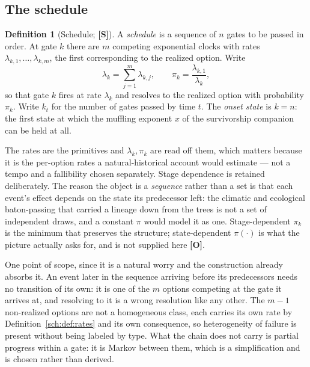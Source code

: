 \documentclass[11pt]{article}
\theoremstyle{plain}
\theoremstyle{definition}
\newtheorem{definition}[theorem]{Definition}
\theoremstyle{remark}
\begin{document}
\subsection{The schedule}\label{sch:subsub:model}

\begin{definition}[Schedule; \textbf{[S]}]\label{sch:def:schedule}
A \emph{schedule} is a sequence of $n$ gates to be passed in order. At
gate $k$ there are $m$ competing exponential clocks with rates
$\lambda_{k,1},\dots,\lambda_{k,m}$, the first corresponding to the
realized option. Write
\begin{equation}\label{sch:eq:clocks}
\lambda_k=\sum_{j=1}^{m}\lambda_{k,j},
\qquad
\pi_k=\frac{\lambda_{k,1}}{\lambda_k},
\end{equation}
so that gate $k$ fires at rate $\lambda_k$ and resolves to the realized
option with probability $\pi_k$. Write $k_t$ for the number of gates
passed by time $t$. The \emph{onset state} is $k=n$: the first state at
which the muffling exponent $x$ of the survivorship companion \cite{SurvA} can be held at all.
\end{definition}

The rates are the primitives and $\lambda_k,\pi_k$ are read off them,
which matters because it is the per-option rates a natural-historical
account would estimate --- not a tempo and a fallibility chosen
separately. Stage dependence is retained deliberately. The reason the object is a
\emph{sequence} rather than a set is that each event's effect depends on
the state its predecessor left: the climatic and ecological
baton-passing that carried a lineage down from the trees is not a set of
independent draws, and a constant $\pi$ would model it as one.
Stage-dependent $\pi_k$ is the minimum that preserves the structure;
state-dependent $\pi(\cdot)$ is what the picture actually asks for, and
is not supplied here \textbf{[O]}.

One point of scope, since it is a natural worry and the construction
already absorbs it. An event later in the sequence arriving before its
predecessors needs no transition of its own: it is one of the $m$
options competing at the gate it arrives at, and resolving to it is a
wrong resolution like any other. The $m-1$ non-realized options are not
a homogeneous class, each carries its own rate by
Definition~\ref{sch:def:rates} and its own consequence, so
heterogeneity of failure is present without being labeled by type. What
the chain does not carry is partial progress within a gate: it is Markov
between them, which is a simplification and is chosen rather than
derived.
\end{document}
